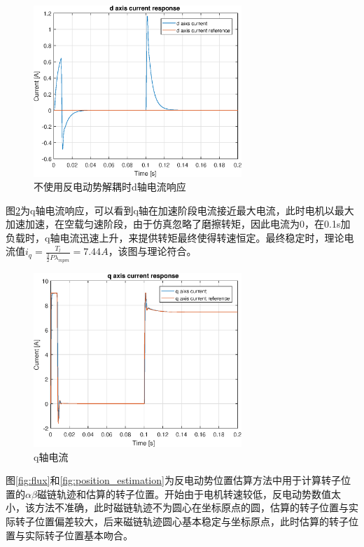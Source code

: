 \begin{figure}[H]
	\centering
	\includegraphics[width=0.7\textwidth]{figs/id_without_decouple.eps}
	\caption{不使用反电动势解耦时d轴电流响应}
	\label{fig:id_without_decouple}
\end{figure}
图\ref{fig:iq}为q轴电流响应，可以看到q轴在加速阶段电流接近最大电流，此时电机以最大加速加速，在空载匀速阶段，由于仿真忽略了磨擦转矩，因此电流为0，在0.1s加负载时，q轴电流迅速上升，来提供转矩最终使得转速恒定。最终稳定时，理论电流值$i_{q}=\frac{T_{l}}{\frac{3}{2}P\lambda_{mpm}}=7.44A$，该图与理论符合。
\begin{figure}[H]
	\centering
	\includegraphics[width=0.7\textwidth]{figs/iq.eps}
	\caption{q轴电流}
	\label{fig:iq}
\end{figure}
图\ref{fig:flux}和\ref{fig:position_estimation}为反电动势位置估算方法中用于计算转子位置的$\alpha\beta$磁链轨迹和估算的转子位置。开始由于电机转速较低，反电动势数值太小，该方法不准确，此时磁链轨迹不为圆心在坐标原点的圆，估算的转子位置与实际转子位置偏差较大，后来磁链轨迹圆心基本稳定与坐标原点，此时估算的转子位置与实际转子位置基本吻合。
